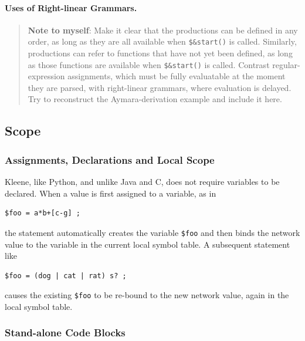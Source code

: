 \documentclass[letterpaper,12pt]{article}
\def\CPP{{C\nolinebreak[4]\hspace{-.08em}\raisebox{.3ex}{\footnotesize\bf
+}\nolinebreak\hspace{-.1em}\raisebox{.3ex}{\footnotesize\bf +}}}
\begin{document}
\paragraph{Uses of Right-linear Grammars.}

\begin{quote}
\textbf{Note to myself}:   Make it clear that the productions can be defined in any order, as long as they
are all available when \verb!$&start()! is called. Similarly,
productions can refer to functions that have not yet been defined,
as long as those functions are available when \verb!$&start()! is
called.  Contrast
regular-expression assignments, which must be fully evaluatable at the
moment they are parsed, with right-linear grammars, where
evaluation is delayed.
Try to reconstruct the Aymara-derivation example and include it here.  
\end{quote}



\subsection{Scope}

\subsubsection{Assignments, Declarations and Local Scope}

Kleene, like Python, and unlike Java and \CPP{}, does not require
variables to be declared.
When a value is first assigned to a variable, as in

\begin{Verbatim}[fontsize=\small]
$foo = a*b+[c-g] ;
\end{Verbatim}

\noindent
the statement automatically creates the variable \verb!$foo! and then binds
the network value to the variable in the current local symbol table.  A
subsequent statement like

\begin{Verbatim}[fontsize=\small]
$foo = (dog | cat | rat) s? ;
\end{Verbatim}

\noindent
causes the existing \verb!$foo! to be re-bound to the new network
value, again in the local symbol table.


\subsubsection{Stand-alone Code Blocks}
\end{document}
